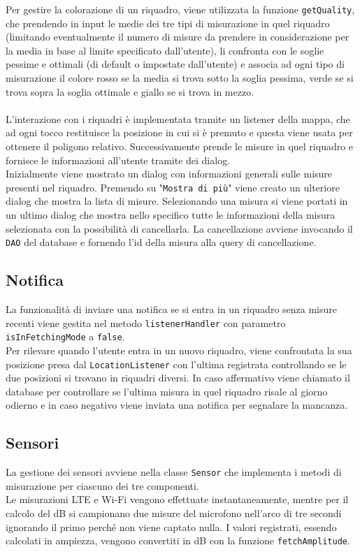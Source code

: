 \documentclass[11pt]{article}
\begin{document}
Per gestire la colorazione di un riquadro, viene utilizzata la funzione \texttt{getQuality}, che prendendo in input le medie dei tre tipi di misurazione in quel riquadro (limitando eventualmente il numero di misure da prendere in considerazione per la media in base al limite specificato dall'utente), li confronta con le soglie pessime e ottimali (di default o impostate dall'utente) e associa ad ogni tipo di misurazione il colore rosso se la media si trova sotto la soglia pessima, verde se si trova sopra la soglia ottimale e giallo se si trova in mezzo. \\ \\
L'interazione con i riquadri è implementata tramite un listener della mappa, che ad ogni tocco restituisce la posizione in cui si è premuto e questa viene usata per ottenere il poligono relativo. Successivamente prende le misure in quel riquadro e fornisce le informazioni all'utente tramite dei dialog. \\
Inizialmente viene mostrato un dialog con informazioni generali sulle misure presenti nel riquadro. Premendo su "\texttt{Mostra di più}" viene creato un ulteriore dialog che mostra la lista di misure. Selezionando una misura si viene portati in un ultimo dialog che mostra nello specifico tutte le informazioni della misura selezionata con la possibilità di cancellarla. La cancellazione avviene invocando il \texttt{DAO} del database e fornendo l'id della misura alla query di cancellazione.
\subsection{Notifica}
\label{sec:notifica}
La funzionalità di inviare una notifica se si entra in un riquadro senza misure recenti viene gestita nel metodo \texttt{listenerHandler} con parametro \texttt{isInFetchingMode} a \texttt{false}. \\
Per rilevare quando l'utente entra in un nuovo riquadro, viene confrontata la sua posizione presa dal \texttt{LocationListener} con l'ultima registrata controllando se le due posizioni si trovano in riquadri diversi. In caso affermativo viene chiamato il database per controllare se l'ultima misura in quel riquadro risale al giorno odierno e in caso negativo viene inviata una notifica per segnalare la mancanza.
\subsection{Sensori}
La gestione dei sensori avviene nella classe \texttt{Sensor} che implementa i metodi di misurazione per ciascuno dei tre componenti. \\
Le misurazioni LTE e Wi-Fi vengono effettuate instantaneamente, mentre per il calcolo del dB si campionano due misure del microfono nell'arco di tre secondi ignorando il primo perché non viene captato nulla. I valori registrati, essendo calcolati in ampiezza, vengono convertiti in dB con la funzione \texttt{fetchAmplitude}.
\pagebreak
\end{document}
